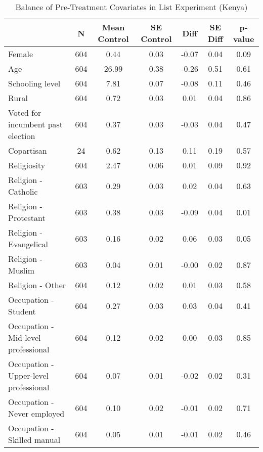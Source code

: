 \begin{table}[htb]
\footnotesize \centering
\caption{Balance of Pre-Treatment Covariates in List Experiment (Kenya)} 
\label{tab:bal_ke}
\begin{tabular}{lcccccc}
  \hline
 & N & Mean Control & SE Control & Diff & SE Diff & p-value \\ 
  \hline
Female & 604 & 0.44 & 0.03 & -0.07 & 0.04 & 0.09 \\ 
  Age & 604 & 26.99 & 0.38 & -0.26 & 0.51 & 0.61 \\ 
  Schooling level & 604 & 7.81 & 0.07 & -0.08 & 0.11 & 0.46 \\ 
  Rural & 604 & 0.72 & 0.03 & 0.01 & 0.04 & 0.86 \\ 
  Voted for incumbent past election & 604 & 0.37 & 0.03 & -0.03 & 0.04 & 0.47 \\ 
  Copartisan & 24 & 0.62 & 0.13 & 0.11 & 0.19 & 0.57 \\ 
  Religiosity & 604 & 2.47 & 0.06 & 0.01 & 0.09 & 0.92 \\ 
  Religion - Catholic & 603 & 0.29 & 0.03 & 0.02 & 0.04 & 0.63 \\ 
  Religion - Protestant & 603 & 0.38 & 0.03 & -0.09 & 0.04 & 0.01 \\ 
  Religion - Evangelical & 603 & 0.16 & 0.02 & 0.06 & 0.03 & 0.05 \\ 
  Religion - Muslim & 603 & 0.04 & 0.01 & -0.00 & 0.02 & 0.87 \\ 
  Religion - Other & 604 & 0.12 & 0.02 & 0.01 & 0.03 & 0.58 \\ 
  Occupation - Student & 604 & 0.27 & 0.03 & 0.03 & 0.04 & 0.41 \\ 
  Occupation - Mid-level professional & 604 & 0.12 & 0.02 & 0.00 & 0.03 & 0.85 \\ 
  Occupation - Upper-level professional & 604 & 0.07 & 0.01 & -0.02 & 0.02 & 0.31 \\ 
  Occupation - Never employed & 604 & 0.10 & 0.02 & -0.01 & 0.02 & 0.71 \\ 
  Occupation - Skilled manual & 604 & 0.05 & 0.01 & -0.01 & 0.02 & 0.46 \\ 
   \hline
\end{tabular}

\end{table}
